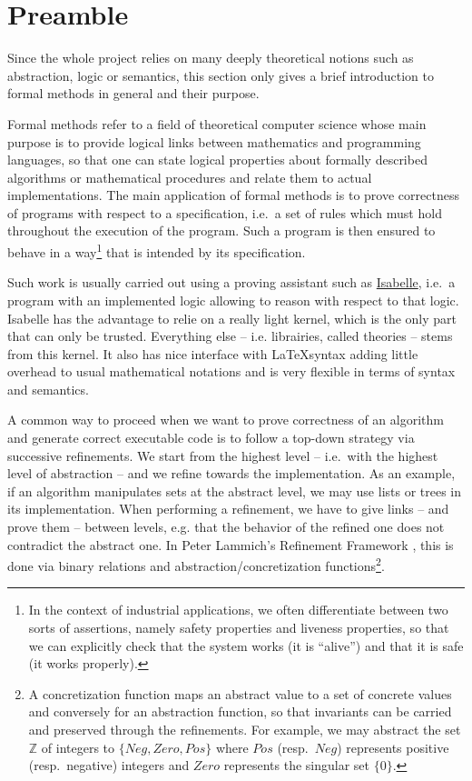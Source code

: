 \documentclass[12pt, a4 paper]{article}
\theoremstyle{definition}
\begin{document}
\section{Preamble}

Since the whole project relies on many deeply theoretical notions such as abstraction, logic or semantics, this section only gives a brief introduction to formal methods in general and their purpose.

\bigskip

Formal methods refer to a field of theoretical computer science whose main purpose is to provide logical links between mathematics and programming languages, so that one can state logical properties about formally described algorithms or mathematical procedures and relate them to actual implementations. The main application of formal methods is to prove correctness of programs with respect to a specification, i.e.\ a set of rules which must hold throughout the execution of the program. Such a program is then ensured to behave in a way\footnote{In the context of industrial applications, we often differentiate between two sorts of assertions, namely safety properties and liveness properties, so that we can explicitly check that the system works (it is ``alive'') and that it is safe (it works properly).} that is intended by its specification.

Such work is usually carried out using a proving assistant such as \href{https://isabelle.in.tum.de}{Isabelle}, i.e.\ a program with an implemented logic allowing to reason with respect to that logic. Isabelle has the advantage to relie on a really light kernel, which is the only part that can only be trusted. Everything else -- i.e. librairies, called theories -- stems from this kernel. It also has nice interface with \LaTeX syntax adding little overhead to usual mathematical notations and is very flexible in terms of syntax and semantics.

A common way to proceed when we want to prove correctness of an algorithm and generate correct executable code is to follow a top-down strategy via successive refinements. We start from the highest level -- i.e.\ with the highest level of abstraction -- and we refine towards the implementation. As an example, if an algorithm manipulates sets at the abstract level, we may use lists or trees in its implementation. When performing a refinement, we have to give links -- and prove them -- between levels, e.g. that the behavior of the refined one does not contradict the abstract one. In Peter Lammich's Refinement Framework \cite{lammich:ref}, this is done via binary relations and abstraction/concretization functions\footnote{A concretization function maps an abstract value to a set of concrete values and conversely for an abstraction function, so that invariants can be carried and preserved through the refinements. For example, we may abstract the set $\mathbb{Z}$ of integers to $\{Neg, Zero, Pos\}$ where $Pos$ (resp.\ $Neg$) represents positive (resp.\ negative) integers and $Zero$ represents the singular set $\{0\}$.}.
\end{document}
